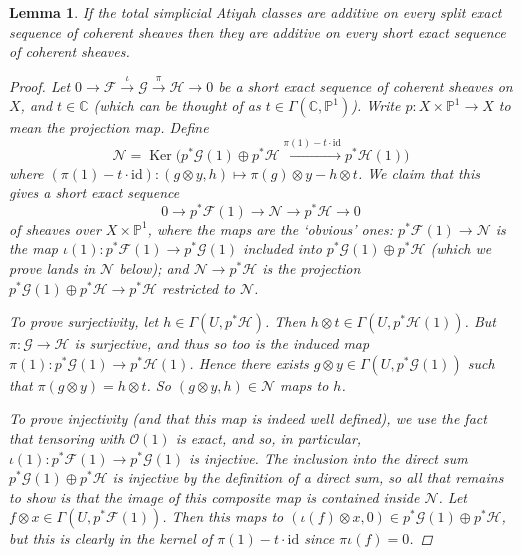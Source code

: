 \documentclass[11pt,fleqn]{article}
\theoremstyle{plain}
\newtheorem{lemma}[theorem]{Lemma}
\theoremstyle{definition}
\theoremstyle{remark}
\numberwithin{equation}{theorem}
\newcommand{\id}{\mathrm{id}}
\DeclareMathOperator{\Ker}{Ker}
\begin{document}
        \begin{lemma}\label{lemma:additive-on-split-implies-additive-on-short}
            If the total simplicial Atiyah classes are additive on every split exact sequence of coherent sheaves then they are additive on every short exact sequence of coherent sheaves.
            \begin{proof}
                Let $0\to\mathscr{F}\xrightarrow{\iota}\mathscr{G}\xrightarrow{\pi}\mathscr{H}\to0$ be a short exact sequence of coherent sheaves on $X$, and $t\in\mathbb{C}$ (which can be thought of as $t\in\Gamma(\mathbb{C},\mathbb{P}^1)$).
                Write $p\colon X\times\mathbb{P}^1\to X$ to mean the projection map.
                Define
                \begin{equation*}
                    \mathcal{N} = \Ker\big(p^*\mathscr{G}(1)\oplus p^*\mathscr{H}\xrightarrow{\pi(1)-t\cdot\id}p^*\mathscr{H}(1)\big)
                \end{equation*}
                where $(\pi(1)-t\cdot\id)\colon (g\otimes y, h)\mapsto \pi(g)\otimes y - h\otimes t$.
                We claim that this gives a short exact sequence
                \begin{equation*}
                    0\to p^*\mathscr{F}(1)\to\mathcal{N}\to p^*\mathscr{H}\to0
                \end{equation*}
                of sheaves over $X\times\mathbb{P}^1$, where the maps are the `obvious' ones: $p^*\mathscr{F}(1)\to\mathcal{N}$ is the map $\iota(1)\colon p^*\mathscr{F}(1)\to p^*\mathscr{G}(1)$ included into $p^*\mathscr{G}(1)\oplus p^*\mathscr{H}$ (which we prove lands in $\mathcal{N}$ below); and $\mathcal{N}\to p^*\mathscr{H}$ is the projection $p^*\mathscr{G}(1)\oplus p^*\mathscr{H}\to p^*\mathscr{H}$ restricted to $\mathcal{N}$.

                To prove surjectivity, let $h\in\Gamma(U,p^*\mathscr{H})$.
                Then $h\otimes t\in\Gamma(U,p^*\mathscr{H}(1))$.
                But \mbox{$\pi\colon\mathscr{G}\to\mathscr{H}$} is surjective, and thus so too is the induced map $\pi(1)\colon p^*\mathscr{G}(1)\to p^*\mathscr{H}(1)$.
                Hence there exists $g\otimes y\in\Gamma(U,p^*\mathscr{G}(1))$ such that $\pi(g\otimes y)=h\otimes t$.
                So $(g\otimes y, h)\in\mathcal{N}$ maps to $h$.

                To prove injectivity (and that this map is indeed well defined), we use the fact that tensoring with $\mathscr{O}(1)$ is exact, and so, in particular, $\iota(1)\colon p^*\mathscr{F}(1)\to p^*\mathscr{G}(1)$ is injective.
                The inclusion into the direct sum $p^*\mathscr{G}(1)\oplus p^*\mathscr{H}$ is injective by the definition of a direct sum, so all that remains to show is that the image of this composite map is contained inside $\mathcal{N}$.
                Let $f\otimes x\in\Gamma(U,p^*\mathscr{F}(1))$.
                Then this maps to $(\iota(f)\otimes x,0)\in p^*\mathscr{G}(1)\oplus p^*\mathscr{H}$, but this is clearly in the kernel of $\pi(1)-t\cdot\id$ since $\pi\iota(f)=0$.


\end{proof}
\end{lemma}
\end{document}
